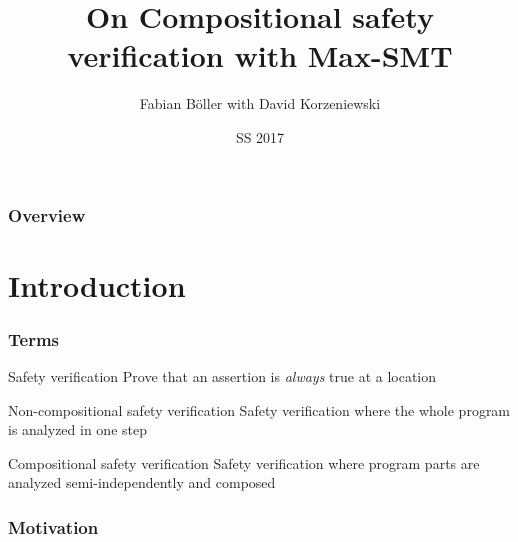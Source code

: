 \documentclass{beamer}
\title[Compositional safety verification]{On Compositional safety verification with Max-SMT} %
\author{Fabian B\"{o}ller with David Korzeniewski} %
\institute[i2] %
{
RWTH Aachen \\ %
\medskip
\textit{fabian.boeller@rwth-aachen.de} %
}
\date{SS 2017} %
\begin{document}
\begin{frame}
\titlepage %
\end{frame}

\begin{frame}
\frametitle{Overview} %
\tableofcontents %
\end{frame}


\section{Introduction}

\begin{frame}
  \frametitle{Terms}
  \begin{block}{Safety verification}
    Prove that an assertion is \emph{always} true at a location
  \end{block}
  \pause
  \begin{block}{Non-compositional safety verification}
    Safety verification where the whole program is analyzed in one step
  \end{block}
  \pause
  \begin{block}{Compositional safety verification}
    Safety verification where program parts are analyzed semi-independently and composed
  \end{block}
\end{frame}

\begin{frame}
  \frametitle{Motivation}
  \begin{figure}
    \centering
  \end{figure}
\end{frame}
\end{document}
